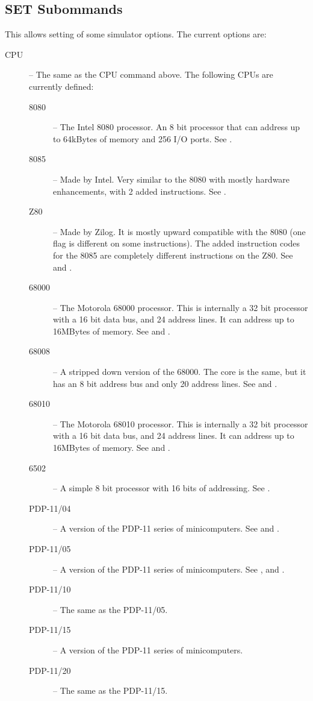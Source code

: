 \documentclass[10pt, openany]{book}
\begin{document}
\subsection{SET Subommands}
\label{cmd-set}
This allows setting of some simulator options.
The current options are:
\begin{description}
  \item[CPU] -- The same as the CPU command above.  The following CPUs are currently defined:
  \begin{description}
    \item[8080] -- The Intel 8080 processor.  An 8 bit processor that can address up to 64kBytes of memory and 256 I/O ports.  See \cite{i8080}.
    \item[8085] -- Made by Intel.  Very similar to the 8080 with mostly hardware enhancements, with 2 added instructions.  See \cite{i8080}.
    \item[Z80] -- Made by Zilog.  It is mostly upward compatible with the 8080 (one flag is different on some instructions).  The added instruction codes for the 8085 are completely different instructions on the Z80.  See \cite{z80} and \cite{z80undoc}.
    \item[68000] -- The Motorola 68000 processor.  This is internally a 32 bit processor with a 16 bit data bus, and 24 address lines.  It can address up to 16MBytes of memory.  See \cite{m68000a} and \cite{m68000b}.
    \item[68008] -- A stripped down version of the 68000.  The core is the same, but it has an 8 bit address bus and only 20 address lines.  See \cite{m68000a} and \cite{m68000b}.
    \item[68010] -- The Motorola 68010 processor.  This is internally a 32 bit processor with a 16 bit data bus, and 24 address lines.  It can address up to 16MBytes of memory.  See \cite{m68000a} and \cite{m68000b}.
    \item[6502] -- A simple 8 bit processor with 16 bits of addressing.  See \cite{msc6502}.
    \item[PDP-11/04] -- A version of the PDP-11 series of minicomputers.  See \cite{dec75} and \cite{dec80}.
    \item[PDP-11/05] -- A version of the PDP-11 series of minicomputers.  See \cite{PDP1105}, \cite{dec75} and \cite{dec80}.
    \item[PDP-11/10] -- The same as the PDP-11/05.
    \item[PDP-11/15] -- A version of the PDP-11 series of minicomputers.
    \item[PDP-11/20] -- The same as the PDP-11/15.

\end{description}
\end{description}
\end{document}
